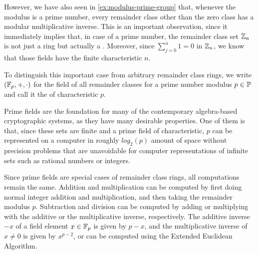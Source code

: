 However, we have also seen in \ref{ex:modulus-prime-group} that, whenever the modulus is a prime number, every remainder class other than the zero class has a modular multiplicative inverse. This is an important observation, since it immediately implies that, in case of a prime number, the remainder class set $\mathbb{Z}_n$ is not just a ring but actually a . Moreover, since $\sum_{j=0}^n 1 = 0$ in $\mathbb{Z}_n$, we know that those fields have the finite characteristic $n$.

To distinguish this important case from arbitrary remainder class rings, we write  $ (\mathbb{F}_p, +, \cdot) $ for the field of all remainder classes for a prime number modulus $p \in \mathbb{P}$ and call it the  of characteristic $p$.

Prime fields are the foundation for many of the contemporary algebra-based cryptographic systems, as they have many desirable properties. One of them is that, since these sets are finite and a prime field of characteristic, $p$ can be represented on a computer in roughly $log_2(p)$ amount of space without precision problems that are unavoidable for computer representations of infinite sets such as rational numbers or integers.

Since prime fields are special cases of remainder class rings, all computations remain the same. Addition and multiplication can be computed by first doing normal integer addition and multiplication, and then taking the remainder modulus $p$. Subtraction and division can be computed by adding or multiplying with the additive or the multiplicative inverse, respectively. The additive inverse $-x$ of a field element $x\in\mathbb{F}_p$ is given by $p-x$, and the multiplicative inverse of $x\neq 0$ is given by $x^{p-2}$, or can be computed using the Extended Euclidean Algorithm.

